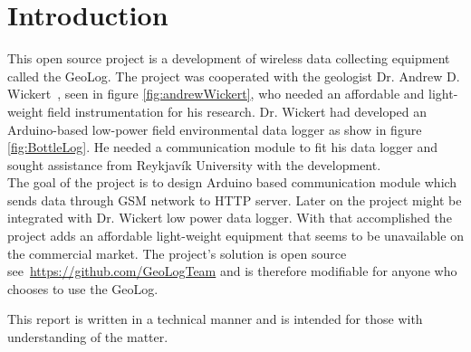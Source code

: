 \section*{Introduction}
This open source project is a development of wireless data collecting equipment called the GeoLog. The project was cooperated with the geologist Dr. Andrew D. Wickert~\cite{andrewWickert}, seen in figure \ref{fig:andrewWickert}, who needed an affordable and light-weight field instrumentation for his research. Dr. Wickert had developed an Arduino-based\cite{arduinoMega}  low-power field environmental data logger as show in figure \ref{fig:BottleLog}. He needed a communication module to fit his data logger and sought assistance from Reykjavík University with the development.\\
The goal of the project is to design Arduino based communication module which sends data through GSM network to HTTP server. Later on the project might be integrated with Dr. Wickert low power data logger. With that accomplished the project adds an affordable light-weight equipment that seems to be unavailable on the commercial market. The project's solution is open source see~\url{https://github.com/GeoLogTeam} and is therefore modifiable for anyone who chooses to use the GeoLog.

This report is written in a technical manner and is intended for those with understanding of the matter.